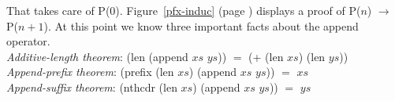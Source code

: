 That takes care of P(0). Figure~\ref{pfx-induc}
(page \pageref{pfx-induc}) displays a proof of P($n$) $\rightarrow$ P($n+1$).
At this point we know three important facts about the \textsf{append} operator.\\
\hspace*{1cm}\emph{Additive-length theorem}: \textsf{(len (append $xs$ $ys$))} $=$ \textsf{(+ (len $xs$) (len $ys$))}\label{app-pfx-thm}\\
\hspace*{1cm}\emph{Append-prefix theorem}: \textsf{(prefix (len $xs$) (append $xs$ $ys$))} $=$ $xs$\\
\hspace*{1cm}\emph{Append-suffix theorem}: \textsf{(nthcdr (len $xs$) (append $xs$ $ys$))} $=$ $ys$

